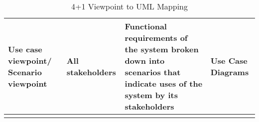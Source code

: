 \begin{sidewaystable}[h]
\begin{tabularx}{\textwidth}{X X X X}
\multicolumn{1}{|X|}{Use case viewpoint/ Scenario viewpoint}     & \multicolumn{1}{X|}{All stakeholders}                             & \multicolumn{1}{X|}{Functional requirements of the system broken down into scenarios that indicate uses of the system by its stakeholders}                                     & \multicolumn{1}{X|}{Use Case Diagrams}                                                                         \\ \hline
                                                                 &                                                                   &                                                                                                                                                                                &                                                                                                               
\end{tabularx}
\caption{4+1 Viewpoint to UML Mapping}
\label{table:viewpoints}
\end{sidewaystable}



